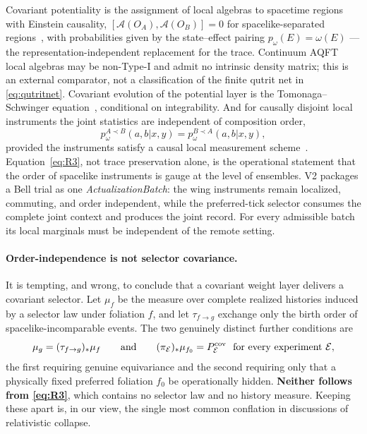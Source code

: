 \documentclass[11pt,a4paper]{article}
\theoremstyle{definition}
\theoremstyle{plain}
\theoremstyle{remark}
\begin{document}
Covariant potentiality is the assignment of local algebras to spacetime
regions with Einstein causality,
$[\mathcal{A}(O_A),\mathcal{A}(O_B)] = 0$ for spacelike-separated
regions~\cite{haagkastler,haag}, with probabilities given by the
state--effect pairing $p_\omega(E) = \omega(E)$ --- the
representation-independent replacement for the trace. Continuum AQFT local
algebras may be non-Type-I and admit no intrinsic density matrix; this is an
external comparator, not a classification of the finite qutrit net in
\eqref{eq:qutritnet}.
Covariant evolution of the potential layer is the Tomonaga--Schwinger
equation~\cite{tomonaga}, conditional on integrability. And for
causally disjoint local instruments the joint statistics are independent
of composition order,
\begin{equation}
p_\omega^{A\prec B}(a,b|x,y) = p_\omega^{B\prec A}(a,b|x,y),
\label{eq:R3}
\end{equation}
provided the instruments satisfy a causal local measurement
scheme~\cite{fewsterverch}. Equation~\eqref{eq:R3}, not trace
preservation alone, is the operational statement that the order of
spacelike instruments is gauge at the level of ensembles. V2 packages a
Bell trial as one \emph{ActualizationBatch}: the wing instruments remain
localized, commuting, and order independent, while the preferred-tick
selector consumes the complete joint context and produces the joint record.
For every admissible batch its local marginals must be independent of the
remote setting.

\paragraph{Order-independence is not selector covariance.}

It is tempting, and wrong, to conclude that a covariant weight layer
delivers a covariant selector. Let $\mu_f$ be the measure over complete
realized histories induced by a selector law under foliation $f$, and let
$\tau_{f\to g}$ exchange only the birth order of spacelike-incomparable
events. The two genuinely distinct further conditions are
\begin{equation}
\mu_g = (\tau_{f\to g})_*\mu_f
\qquad\text{and}\qquad
(\pi_{\mathcal{E}})_*\mu_{f_0} = P^{\rm cov}_{\mathcal{E}}
\ \ \text{for every experiment } \mathcal{E},
\label{eq:R4}
\end{equation}
the first requiring genuine equivariance and the second requiring only
that a physically fixed preferred foliation $f_0$ be operationally
hidden. \textbf{Neither follows from \eqref{eq:R3}}, which contains no
selector law and no history measure. Keeping these apart is, in our view,
the single most common conflation in discussions of relativistic
collapse.
\end{document}

